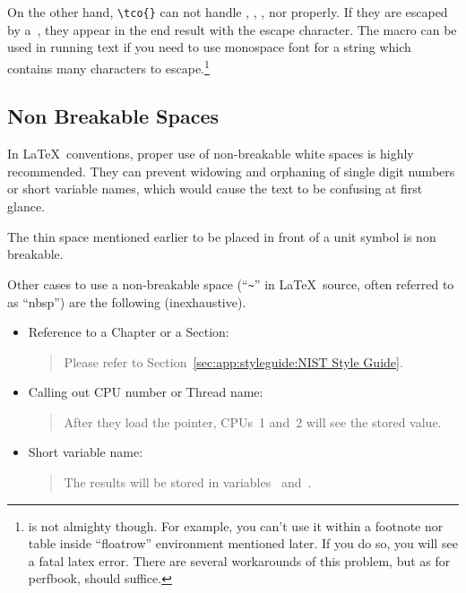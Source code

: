 On the other hand, \verb|\tco{}| can not handle
\qco{\%}, \qco{\{}, \qco{\}}, nor \qco{\\} properly.
If they are escaped by a~\qco{\\},
they appear in the end result with the escape character.
The \qco{\\verb} macro can be used in running text if you
need to use monospace font for a string which contains
many characters to escape.\footnote{
  \co{\\verb} is not almighty though. For example, you can't use it
  within a footnote nor table inside ``floatrow'' environment mentioned
  later. If you do so, you will see a fatal latex error.
  There are several workarounds of this problem, but as for perfbook,
  \co{\\co\{\}} should suffice.}

\subsection{Non Breakable Spaces}
\label{sec:app:styleguide:Non Breakable Spaces}

In \LaTeX\ conventions, proper use of non-breakable white spaces
is highly recommended. They can prevent widowing and orphaning
of single digit numbers or short variable names, which would
cause the text to be confusing at first glance.

The thin space mentioned earlier to be placed in front of a unit
symbol is non breakable.

Other cases to use a non-breakable space (``\verb|~|'' in \LaTeX\
source, often referred to as ``nbsp'')
are the following (inexhaustive).

\begin{itemize}
\item Reference to a Chapter or a Section:
  \begin{quote}
    Please refer to Section~\ref{sec:app:styleguide:NIST Style Guide}.
  \end{quote}
\item Calling out CPU number or Thread name:
  \begin{quote}
    After they load the pointer, CPUs~1 and~2 will see the stored
    value.
  \end{quote}
\item Short variable name:
  \begin{quote}
    The results will be stored in variables~ and~.
  \end{quote}
\end{itemize}

